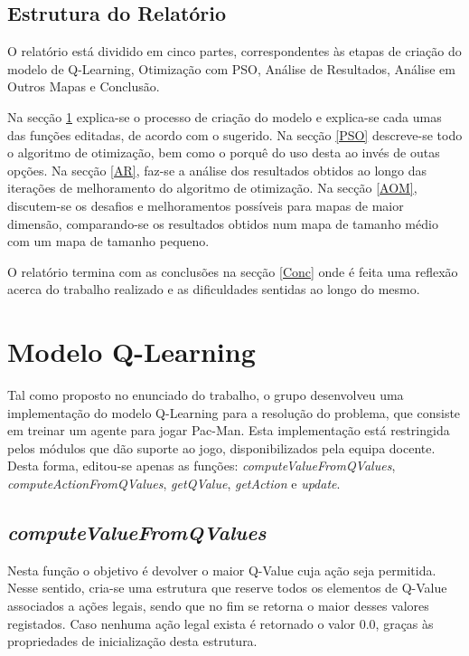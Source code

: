 \documentclass[runningheads]{article}
\begin{document}
\subsection{Estrutura do Relatório}
\par O relatório está dividido em cinco partes, correspondentes às etapas de criação do modelo de Q-Learning, Otimização com PSO, Análise de Resultados, Análise em Outros Mapas e Conclusão.
\par Na secção \ref{QL} explica-se o processo de criação do modelo e explica-se cada umas das funções editadas, de acordo com o sugerido. Na secção \ref{PSO} descreve-se todo o algoritmo de otimização, bem como o porquê do uso desta ao invés de outas opções. Na secção \ref{AR}, faz-se a análise dos resultados obtidos ao longo das iterações de melhoramento do algoritmo de otimização. Na secção \ref{AOM}, discutem-se os desafios e melhoramentos possíveis para mapas de maior dimensão, comparando-se os resultados obtidos num mapa de tamanho médio com um mapa de tamanho pequeno.
\par O relatório termina com as conclusões na secção \ref{Conc} onde é feita uma reflexão acerca do trabalho realizado e as dificuldades sentidas ao longo do mesmo.

\newpage
\section{Modelo Q-Learning}
\label{QL} Tal como proposto no enunciado do trabalho, o grupo desenvolveu uma implementação do modelo Q-Learning para a resolução do problema, que consiste em treinar um agente para jogar Pac-Man. Esta implementação está restringida pelos módulos que dão suporte ao jogo, disponibilizados pela equipa docente. Desta forma, editou-se apenas as funções: \textit{computeValueFromQValues}, \textit{computeActionFromQValues}, \textit{getQValue}, \textit{getAction} e \textit{update}.

\subsection{\textit{computeValueFromQValues}}
Nesta função o objetivo é devolver o maior Q-Value cuja ação seja permitida. Nesse sentido, cria-se uma estrutura que reserve todos os elementos de Q-Value associados a ações legais, sendo que no fim se retorna o maior desses valores registados. Caso nenhuma ação legal exista é retornado o valor 0.0, graças às propriedades de inicialização desta estrutura.
\end{document}

